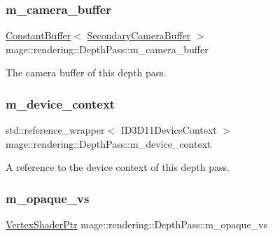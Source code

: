 \subsubsection{\texorpdfstring{m\+\_\+camera\+\_\+buffer}{m\_camera\_buffer}}
{\footnotesize\ttfamily \mbox{\hyperlink{classmage_1_1rendering_1_1_constant_buffer}{Constant\+Buffer}}$<$ \mbox{\hyperlink{structmage_1_1rendering_1_1_secondary_camera_buffer}{Secondary\+Camera\+Buffer}} $>$ mage\+::rendering\+::\+Depth\+Pass\+::m\+\_\+camera\+\_\+buffer\hspace{0.3cm}{\ttfamily [private]}}

The camera buffer of this depth pass. \mbox{\label{classmage_1_1rendering_1_1_depth_pass_a304b434841fb8a8b443df0e790630023}} 
\subsubsection{\texorpdfstring{m\+\_\+device\+\_\+context}{m\_device\_context}}
{\footnotesize\ttfamily std\+::reference\+\_\+wrapper$<$ I\+D3\+D11\+Device\+Context $>$ mage\+::rendering\+::\+Depth\+Pass\+::m\+\_\+device\+\_\+context\hspace{0.3cm}{\ttfamily [private]}}

A reference to the device context of this depth pass. \mbox{\label{classmage_1_1rendering_1_1_depth_pass_a101f60b0363f79f9d349ea95e0efabe5}} 
\subsubsection{\texorpdfstring{m\+\_\+opaque\+\_\+vs}{m\_opaque\_vs}}
{\footnotesize\ttfamily \mbox{\hyperlink{namespacemage_1_1rendering_aaf704b9c54a4181f4950a1761de69dda}{Vertex\+Shader\+Ptr}} mage\+::rendering\+::\+Depth\+Pass\+::m\+\_\+opaque\+\_\+vs\hspace{0.3cm}{\ttfamily [private]}}

